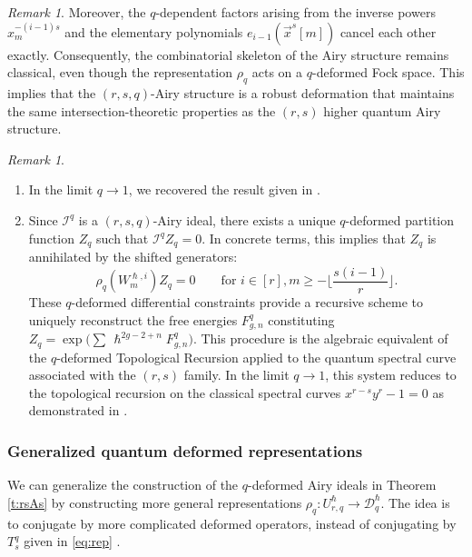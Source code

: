 \documentclass[reqno,11pt]{amsart}
\theoremstyle{plain}
\theoremstyle{definition}
\theoremstyle{remark}
\newtheorem{remark}[theorem]{Remark}
\numberwithin{equation}{section}
\newcommand{\1}{\mathds{1}}
\newcommand{\2}{\frac{1}{2}}
\begin{document}
{\begin{remark}
					{Moreover, the $q$-dependent factors arising from the inverse powers $x_m^{-(i-1)s}$ and the elementary polynomials $e_{i-1}(\vec{{x}}^s[m])$ cancel each other exactly. Consequently, the combinatorial skeleton of the Airy structure remains classical, even though the representation $\rho_q$ acts on a $q$-deformed Fock space. This implies that the $(r,s,q)$-Airy structure is a robust deformation that maintains the same intersection-theoretic properties as the $(r,s)$ higher quantum Airy structure.}
				\end{remark}
				\begin{remark}
					\begin{enumerate}
						\item[(a)] In the limit $q\rightarrow 1$, we recovered the result given in {\cite[Theorem~4.9]{BBCCN18}}.
						\item[(b)]	
						Since $\mathcal{I}^q$ is a $(r,s,q)$-Airy ideal, there exists a unique $q$-deformed partition function $Z_q$ such that $\mathcal{I}^q Z_{q} = 0$. In concrete terms, this implies that $Z_q$ is annihilated by the shifted generators:
						\begin{equation}
							\rho_q(W_m^{\hslash,i}) Z_q = 0 \qquad \text{for $i \in [r], m \geq - \lfloor \frac{s(i-1)}{r} \rfloor$.}
						\end{equation}
						These  $q$-deformed differential constraints provide a recursive scheme to uniquely reconstruct the free energies $F^{q}_{g,n}$ constituting $Z_q=\exp\big(\sum\,\hslash^{2g-2+n}F^{q}_{g,n}\big)$. This procedure is the algebraic equivalent of the  $q$-deformed Topological Recursion applied to the quantum spectral curve associated with the $(r,s)$ family. In the limit $q\rightarrow 1$, this system reduces to the topological recursion on the classical spectral curves $x^{r-s} y^r - 1 = 0$ as demonstrated in \cite{BBCCN18}.
					\end{enumerate}
					\end{remark}
				
				\subsubsection{Generalized quantum deformed representations}
				{We can generalize the construction of the $q$-deformed Airy ideals in Theorem \ref{t:rsAs} by constructing more general representations $\rho_q: U^\hslash_{r,q} \to \mathcal{D}_{q}^\hslash$.
					The idea is to conjugate by more complicated deformed operators, instead of conjugating by $T^q_s$ given in \eqref{eq:rep} .}
				
}
\end{document}
